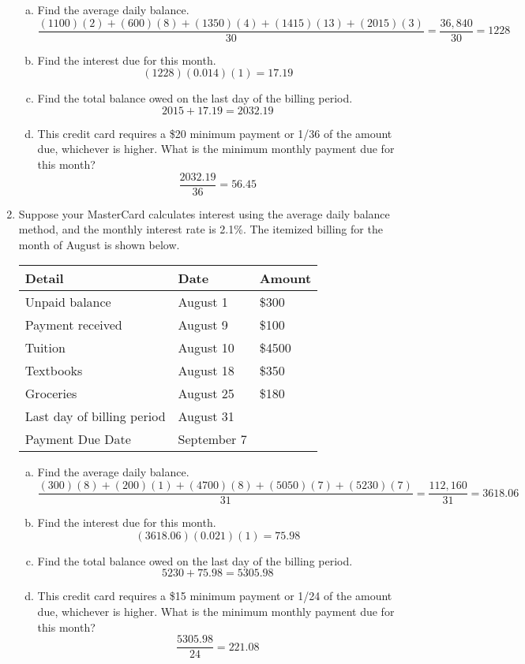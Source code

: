 \begin{enumerate}
\begin{enumerate}[(a)]
\item Find the average daily balance. 
\[\dfrac{(1100)(2) + (600)(8) + (1350)(4) + (1415)(13) + (2015)(3)}{30} = \dfrac{36,840}{30} = 1228\]

\item Find the interest due for this month. 
\[(1228)(0.014)(1) = 17.19\]

\item Find the total balance owed on the last day of the billing period. 
\[2015 + 17.19 = 2032.19\]

\item This credit card requires a \$20 minimum payment or 1/36 of the amount due, whichever is higher.  What is the minimum monthly payment due for this month? 
\[\dfrac{2032.19}{36} = 56.45\]
\end{enumerate}

\item Suppose your MasterCard calculates interest using the average daily balance method, and the monthly interest rate is 2.1\%.  The itemized billing for the month of August is shown below.\\

\begin{tabular}{l l l}
Detail & Date & Amount\\
\hline
Unpaid balance & August 1 & \$300\\
Payment received & August 9 & \$100\\
Tuition & August 10 & \$4500\\
Textbooks & August 18 & \$350\\
Groceries & August 25 & \$180\\
Last day of billing period & August 31 &\\
Payment Due Date & September 7 &\\
\end{tabular}

\begin{enumerate}[(a)]
\item Find the average daily balance. 
\[\dfrac{(300)(8) + (200)(1) + (4700)(8) + (5050)(7) + (5230)(7)}{31} = \dfrac{112,160}{31} = 3618.06\]

\item Find the interest due for this month. 
\[(3618.06)(0.021)(1) = 75.98\]

\item Find the total balance owed on the last day of the billing period. 
\[5230 + 75.98 = 5305.98\]

\item This credit card requires a \$15 minimum payment or 1/24 of the amount due, whichever is higher.  What is the minimum monthly payment due for this month? 
\[\dfrac{5305.98}{24} = 221.08\]
\end{enumerate}
\end{enumerate}